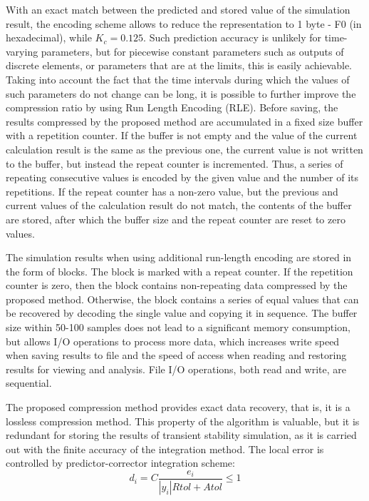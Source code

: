 \documentclass[lettersize,journal]{IEEEtran}
\begin{document}
With an exact match between the predicted and stored value of the simulation result, the encoding scheme allows to reduce the
representation to 1 byte - F0 (in hexadecimal), while \(K_c=0.125\). Such prediction accuracy is unlikely for time-varying parameters, 
but for piecewise constant parameters such as outputs of discrete elements, or parameters that are at the limits, this is easily achievable. 
Taking into account the fact that the time intervals during which the values of such parameters do not change can be long, 
it is possible to further improve the compression ratio by using Run Length Encoding (RLE). 
Before saving, the results compressed by the proposed method are accumulated in a fixed size buffer with a repetition counter. 
If the buffer is not empty and the value of the current calculation result is the same as the previous one, the current value 
is not written to the buffer, but instead the repeat counter is incremented. Thus, a series of repeating consecutive values is 
encoded by the given value and the number of its repetitions.
If the repeat counter has a non-zero value, but the previous and current values of the calculation result do not match, 
the contents of the buffer are stored, after which the buffer size and the repeat counter are reset to zero values.

The simulation results when using additional run-length encoding are stored in the form of blocks. 
The block is marked with a repeat counter. If the repetition counter is zero, then the block contains non-repeating 
data compressed by the proposed method. Otherwise, the block contains a series of equal values that can be recovered 
by decoding the single value and copying it in sequence. The buffer size within 50-100 samples does not lead to a significant memory consumption, but allows I/O operations to process more data, which increases write speed when saving results to file
and the speed of access when reading and restoring results for viewing and analysis. 
File I/O operations, both read and write, are sequential.

The proposed compression method provides exact data recovery, that is, it is a lossless compression method. 
This property of the algorithm is valuable, but it is redundant for storing the results of 
transient stability simulation, as it is carried out with the finite accuracy of the integration method. 
The local error is controlled by predictor-corrector integration scheme:
\begin{equation}
	\label{eqn_interror}
	d_i=C\frac{e_i}{|y_i|Rtol+Atol} \leq 1
\end{equation}
\end{document}
